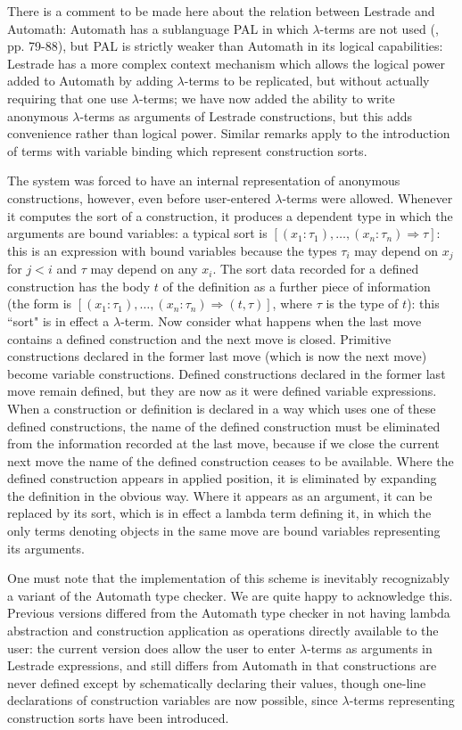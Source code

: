 \documentclass[12pt]{article}
\begin{document}
There is a comment to be made here about the relation between Lestrade and Automath:  Automath has a sublanguage PAL in which $\lambda$-terms are not used (\cite{automathbook}, pp. 79-88), but PAL is strictly weaker than Automath in its logical capabilities:  Lestrade has a more complex context mechanism which allows the logical power added to Automath by adding $\lambda$-terms to be replicated, but without actually requiring that one use $\lambda$-terms;  we have now added the ability to write anonymous $\lambda$-terms as arguments of  Lestrade constructions, but this adds convenience rather than logical power.  Similar remarks apply to the introduction of terms with variable binding which represent construction sorts.

The system was forced to have an internal representation of anonymous constructions, however, even before user-entered $\lambda$-terms were allowed.   Whenever it computes the sort of a construction, it produces a dependent type in which the
arguments are bound variables:  a typical sort is $[(x_1:\tau_1),\ldots,(x_n:\tau_n) \Rightarrow \tau]$:  this is an expression with bound variables because the types $\tau_i$ may depend on $x_j$ for $j<i$ and $\tau$ may depend on any $x_i$.  The sort data recorded for a defined construction has the body $t$ of the definition as a further piece of information  (the form is $[(x_1:\tau_1),\ldots,(x_n:\tau_n) \Rightarrow (t,\tau)]$, where $\tau$ is the type of $t$):  this ``sort"  is in effect a $\lambda$-term.
Now consider what happens when the last move contains a defined construction and the next move is closed.  Primitive constructions declared in the former last move (which is now the next move) become variable constructions.   Defined constructions declared in the former last move remain defined, but they are now as it were defined variable
expressions.   When a construction or definition is declared in a way which uses one of these defined constructions, the name of the defined construction must be eliminated from the information recorded at the last move, because if we close the current next move the name of the defined construction ceases to be available.  Where the defined construction appears in applied position,
it is eliminated by expanding the definition in the obvious way.   Where it appears as an argument, it can be replaced by its sort, which is in effect a lambda term defining it, in which the only terms denoting objects in the same move are bound variables representing its arguments.

One must note that the implementation of this scheme is inevitably recognizably a variant of the Automath type checker.   We are quite happy to acknowledge this.  Previous versions differed from the Automath type checker in not having lambda abstraction and construction application as operations directly available to the user:  the current version does allow the user to enter $\lambda$-terms as arguments in Lestrade expressions, and still differs from Automath in that constructions are never defined  except by schematically declaring their values, though one-line declarations of construction variables are now possible, since $\lambda$-terms representing construction sorts have been introduced.
\end{document}
